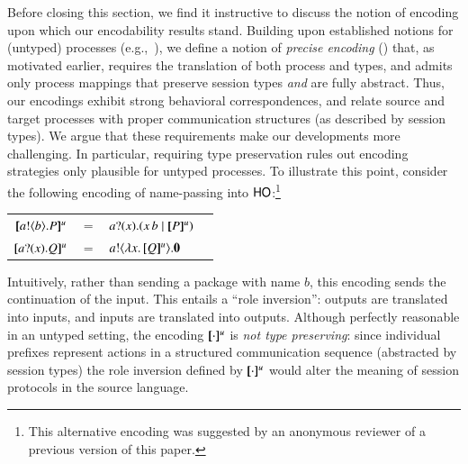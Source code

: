 Before closing this section, we find it instructive to discuss the notion of encoding 
upon which our 
encodability results stand.
Building upon established notions for (untyped) processes (e.g.,~\cite{DBLP:journals/iandc/Gorla10}), 
we define a notion of \emph{precise encoding} () that, as motivated earlier,  
requires the translation of both process and types, and 
admits only process mappings that preserve session types
\emph{and} are fully abstract. Thus, our encodings 
exhibit   strong behavioral correspondences, and 
 relate source and target processes with  
proper communication structures (as described by session types).
We argue that these requirements make our developments more challenging.
In particular, requiring type preservation rules out encoding strategies only plausible for untyped processes.
To illustrate this point,
consider the  following encoding of %
name-passing 
into $\mathsf{HO}$:\footnote{This alternative  encoding was suggested by an anonymous reviewer of a previous version of this paper.} %
\begin{center}
\begin{tabular}{rcll}
  $[\!\![a ! \langle b \rangle . P]\!\!]^u$	&$=$&	$a ? (x) .( x\, {b} \;|\; [\!\![P]\!\!]^u)$ \\
  $[\!\![a ? (x) . Q]\!\!]^u$	&$=$&	$a ! \langle \lambda x.\,[\!\![Q]\!\!]^u \rangle . \mathbf{0}$
\end{tabular}
\end{center}
Intuitively, 
rather than sending a package with name $b$, 
this encoding sends the continuation of the input. This entails  a 
``role inversion'': outputs are translated into inputs, and inputs are translated into outputs. 
Although perfectly reasonable in an  {untyped setting}, the encoding $[\!\![\cdot]\!\!]^u$  
is \emph{not type preserving}: 
since 
individual  prefixes represent actions in a structured communication sequence (abstracted by session types)
the role inversion defined by $[\!\![\cdot]\!\!]^u$ would alter the meaning of session protocols in the source language.

